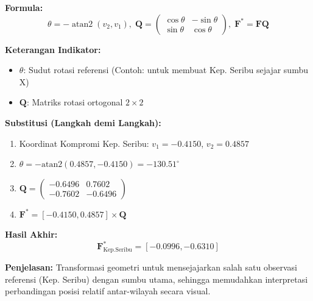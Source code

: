 \documentclass[11pt,a4paper]{article}
\begin{document}
\begin{tcolorbox}[formula_box, title={Rotasi Baseline}]
\textbf{Formula:}
\[ \theta=-\operatorname{atan2}(v_2,v_1),\; \mathbf{Q}=\begin{pmatrix}\cos\theta&-\sin\theta\\\sin\theta&\cos\theta\end{pmatrix},\; \mathbf{F}^*=\mathbf{F}\mathbf{Q} \]

\textbf{Keterangan Indikator:}
\begin{itemize}
  \item $\theta$: Sudut rotasi referensi (Contoh: untuk membuat Kep. Seribu sejajar sumbu X)
  \item $\mathbf{Q}$: Matriks rotasi ortogonal $2\times2$
\end{itemize}

\textbf{Substitusi (Langkah demi Langkah):}
\begin{enumerate}
  \item Koordinat Kompromi Kep. Seribu: $v_1=-0.4150$, $v_2=0.4857$
  \item $\theta = -\text{atan2}(0.4857, -0.4150) = -130.51^\circ$
  \item $\mathbf{Q} = \begin{pmatrix} -0.6496 & 0.7602 \\ -0.7602 & -0.6496 \end{pmatrix}$
  \item $\mathbf{F}^* = [-0.4150, 0.4857] \times \mathbf{Q}$
\end{enumerate}

\textbf{Hasil Akhir:}
\[ \mathbf{F}^*_{\text{Kep.Seribu}} = [-0.0996, -0.6310] \]

\textbf{Penjelasan:} Transformasi geometri untuk mensejajarkan salah satu observasi referensi (Kep. Seribu) dengan sumbu utama, sehingga memudahkan interpretasi perbandingan posisi relatif antar-wilayah secara visual.
\end{tcolorbox}
\end{document}

